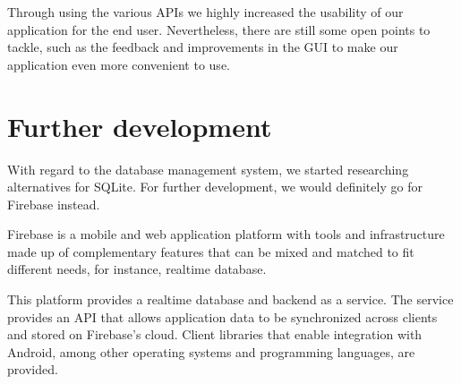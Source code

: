 \documentclass[11pt,twoside,a4paper]{report}
\begin{document}
Through using the various APIs we highly increased the usability of our application for the end user. Nevertheless, there are still some open points to tackle, such as the feedback and improvements in the GUI to make our application even more convenient to use.

\section{Further development}

With regard to the database management system, we started researching alternatives for SQLite. For further development, we would definitely go for Firebase instead. 

Firebase is a mobile and web application platform with tools and infrastructure made up of complementary features that can be mixed and matched to fit different needs, for instance, realtime database.

This platform provides a realtime database and backend as a service. The service provides an API that allows application data to be synchronized across clients and stored on Firebase's cloud. Client libraries that enable integration with Android, among other operating systems and programming languages, are provided.
\end{document}
